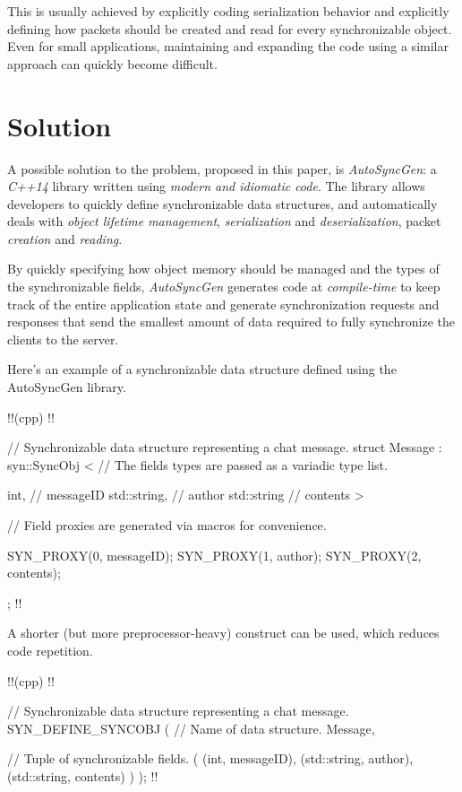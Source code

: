 \documentclass{report}
\begin{document}
            This is usually achieved by explicitly coding serialization behavior and explicitly defining how packets should be created and read for every synchronizable object. Even for small applications, maintaining and expanding the code using a similar approach can quickly become difficult.

        \section{Solution}
            A possible solution to the problem, proposed in this paper, is \emph{AutoSyncGen}: a \emph{C++14} library written using \emph{modern and idiomatic code}.
            The library allows developers to quickly define synchronizable data structures, and automatically deals with \emph{object lifetime management}, \emph{serialization} and \emph{deserialization}, packet \emph{creation} and \emph{reading}.

            By quickly specifying how object memory should be managed and the types of the synchronizable fields, \emph{AutoSyncGen} generates code at \emph{compile-time} to keep track of the entire application state and generate synchronization requests and responses that send the smallest amount of data required to fully synchronize the clients to the server.

            \newpage

            Here's an example of a synchronizable data structure defined using the AutoSyncGen library.

            !!(cpp)
            !!{
    // Synchronizable data structure representing a chat message.
    struct Message : syn::SyncObj
    <
        // The fields types are passed as a variadic type list.

        int,            // messageID
        std::string,    // author
        std::string     // contents
    >
    {
        // Field proxies are generated via macros for convenience.

        SYN_PROXY(0, messageID);
        SYN_PROXY(1, author);
        SYN_PROXY(2, contents);
    };
            !!}

            A shorter (but more preprocessor-heavy) construct can be used, which reduces code repetition.

            !!(cpp)
            !!{
    // Synchronizable data structure representing a chat message.
    SYN_DEFINE_SYNCOBJ
    (
        // Name of data structure.
        Message,

        // Tuple of synchronizable fields.
        (
            (int, messageID),
            (std::string, author),
            (std::string, contents)
        )
    );
            !!}
\end{document}
